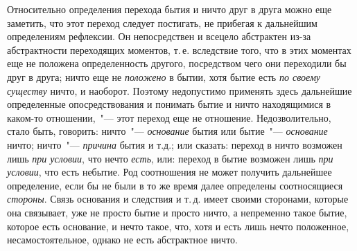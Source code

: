 
Относительно определения перехода бытия и ничто
друг в друга можно еще заметить, что этот переход следует
постигать, не прибегая к дальнейшим определениям
рефлексии. Он непосредствен и всецело абстрактен из-за
абстрактности переходящих моментов, т.\,е. вследствие
того, что в этих моментах еще не положена определенность
другого, посредством чего они переходили бы друг
в друга; ничто еще не \emph{положено} в бытии, хотя бытие есть
\emph{по своему существу} ничто, и наоборот. Поэтому недопустимо
применять здесь дальнейшие определенные опосредствования
и понимать бытие и ничто находящимися
в каком-то отношении,~"--- этот переход еще не отношение.
Недозволительно, стало быть, говорить: ничто~"--- \emph{основание}
бытия или бытие~"--- \emph{основание} ничто; ничто~"--- \emph{причина}
бытия и т.д.; или сказать: переход в ничто возможен
лишь \emph{при условии}, что нечто \emph{есть}, или: переход в бытие
возможен лишь \emph{при условии}, что есть небытие. Род соотношения
не может получить дальнейшее определение,
если бы не были в то же время далее определены соотносящиеся
\emph{стороны}. Связь основания и следствия и т.\,д.
имеет своими сторонами, которые она связывает, уже не
просто бытие и просто ничто, а непременно такое бытие,
которое есть основание, и нечто такое, что, хотя и есть
лишь нечто положенное, несамостоятельное, однако не
есть абстрактное ничто.

